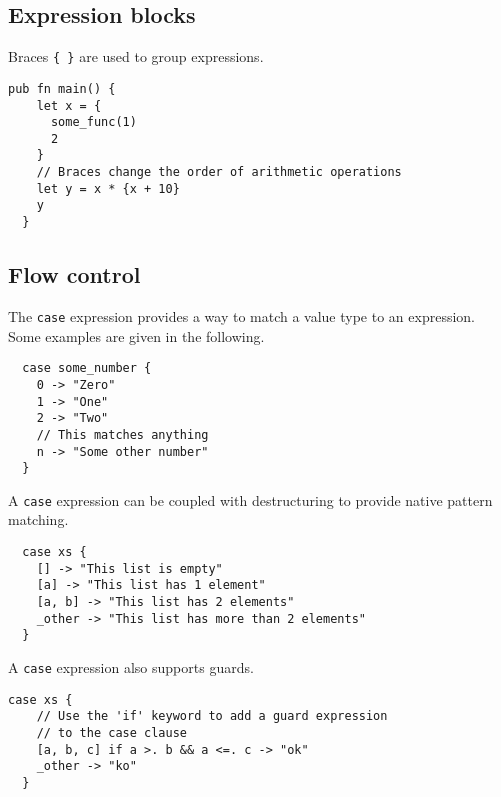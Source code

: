 \vs
\subsection*{\rmfamily Expression blocks}

Braces \lstinline[language=Gleam, basicstyle=\small]!{ }! are used to group
expressions.

\begin{lstlisting}[belowskip=-\baselineskip]
  pub fn main() {
    let x = {
      some_func(1)
      2
    }
    // Braces change the order of arithmetic operations
    let y = x * {x + 10}
    y
  }
\end{lstlisting}


\vs
\subsection*{\rmfamily Flow control}

The \lstinline[language=Gleam, basicstyle=\small]!case! expression provides a way
to match a value type to an expression. Some examples are given in the following.

\begin{lstlisting}
  case some_number {
    0 -> "Zero"
    1 -> "One"
    2 -> "Two"
    // This matches anything
    n -> "Some other number" 
  }
\end{lstlisting}

\vs
A \lstinline[language=Gleam, basicstyle=\small]!case! expression can be coupled
with destructuring to provide native pattern matching.

\begin{lstlisting}
  case xs {
    [] -> "This list is empty"
    [a] -> "This list has 1 element"
    [a, b] -> "This list has 2 elements"
    _other -> "This list has more than 2 elements"
  }
\end{lstlisting}

\vs
A \lstinline[language=Gleam, basicstyle=\small]!case! expression also supports guards.

\begin{lstlisting}[belowskip=-0.3\baselineskip] 
  case xs {
    // Use the 'if' keyword to add a guard expression
    // to the case clause 
    [a, b, c] if a >. b && a <=. c -> "ok"
    _other -> "ko"
  }
  
\end{lstlisting}

